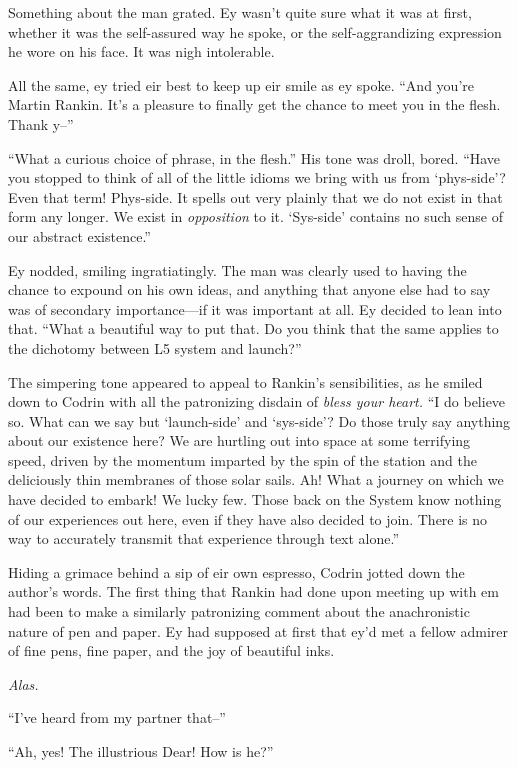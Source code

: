 Something about the man grated. Ey wasn't quite sure what it was at first, whether it was the self-assured way he spoke, or the self-aggrandizing expression he wore on his face. It was nigh intolerable.

All the same, ey tried eir best to keep up eir smile as ey spoke. ``And you're Martin Rankin. It's a pleasure to finally get the chance to meet you in the flesh. Thank y--''

``What a curious choice of phrase, in the flesh.'' His tone was droll, bored. ``Have you stopped to think of all of the little idioms we bring with us from `phys-side'? Even that term! Phys-side. It spells out very plainly that we do not exist in that form any longer. We exist in \emph{opposition} to it. `Sys-side' contains no such sense of our abstract existence.''

Ey nodded, smiling ingratiatingly. The man was clearly used to having the chance to expound on his own ideas, and anything that anyone else had to say was of secondary importance---if it was important at all. Ey decided to lean into that. ``What a beautiful way to put that. Do you think that the same applies to the dichotomy between L5 system and launch?''

The simpering tone appeared to appeal to Rankin's sensibilities, as he smiled down to Codrin with all the patronizing disdain of \emph{bless your heart.} ``I do believe so. What can we say but `launch-side' and `sys-side'? Do those truly say anything about our existence here? We are hurtling out into space at some terrifying speed, driven by the momentum imparted by the spin of the station and the deliciously thin membranes of those solar sails. Ah! What a journey on which we have decided to embark! We lucky few. Those back on the System know nothing of our experiences out here, even if they have also decided to join. There is no way to accurately transmit that experience through text alone.''

Hiding a grimace behind a sip of eir own espresso, Codrin jotted down the author's words. The first thing that Rankin had done upon meeting up with em had been to make a similarly patronizing comment about the anachronistic nature of pen and paper. Ey had supposed at first that ey'd met a fellow admirer of fine pens, fine paper, and the joy of beautiful inks.

\emph{Alas.}

``I've heard from my partner that--''

``Ah, yes! The illustrious Dear! How is he?''

